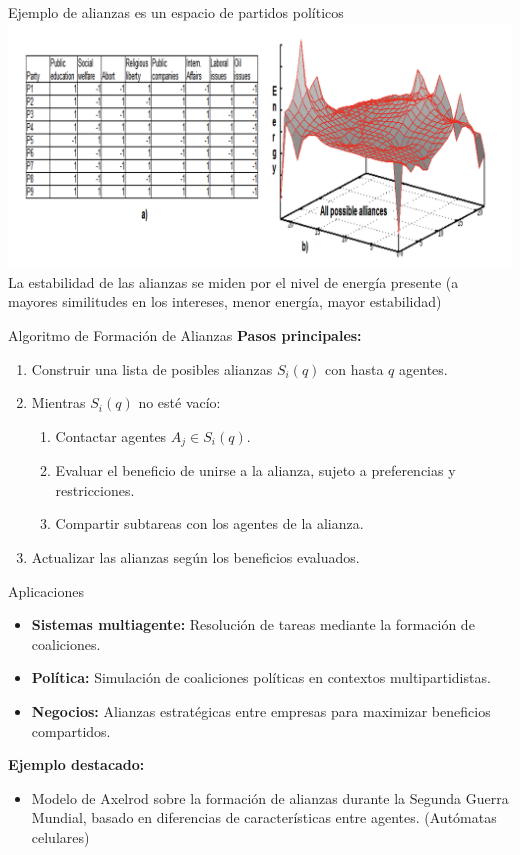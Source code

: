 \documentclass{beamer}
\begin{document}
\begin{frame}{Ejemplo de alianzas es un espacio de partidos políticos}
    \includegraphics[width=1\textwidth]{alianzas.png}
    La estabilidad de las alianzas se miden por el nivel de energía presente (a mayores similitudes en los intereses, menor energía, mayor estabilidad)
\end{frame}

\begin{frame}{Algoritmo de Formación de Alianzas}
    \textbf{Pasos principales:}
    \begin{enumerate}
        \item Construir una lista de posibles alianzas \( S_i(q) \) con hasta \( q \) agentes.
        \item Mientras \( S_i(q) \) no esté vacío:
        \begin{enumerate}
            \item Contactar agentes \( A_j \in S_i(q) \).
            \item Evaluar el beneficio de unirse a la alianza, sujeto a preferencias y restricciones.
            \item Compartir subtareas con los agentes de la alianza.
        \end{enumerate}
        \item Actualizar las alianzas según los beneficios evaluados.
    \end{enumerate}
\end{frame}

\begin{frame}{Aplicaciones}
    \begin{itemize}
        \item \textbf{Sistemas multiagente:} Resolución de tareas mediante la formación de coaliciones.
        \item \textbf{Política:} Simulación de coaliciones políticas en contextos multipartidistas.
        \item \textbf{Negocios:} Alianzas estratégicas entre empresas para maximizar beneficios compartidos.
    \end{itemize}
    
    \textbf{Ejemplo destacado:}
    \begin{itemize}
        \item Modelo de Axelrod sobre la formación de alianzas durante la Segunda Guerra Mundial, basado en diferencias de características entre agentes. (Autómatas celulares)
    \end{itemize}
\end{frame}
\end{document}
